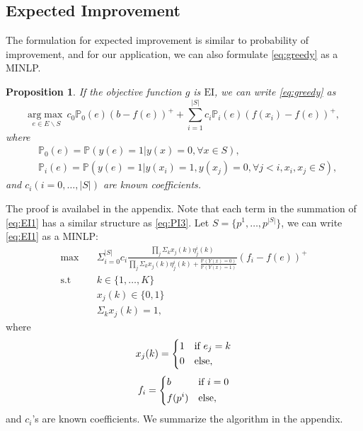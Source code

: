 \documentclass[12pt]{article}
\newcommand{\Prob}{\mathbb{P}}
\newcommand{\EI}{\mathrm{EI}}
\newtheorem{proposition}{Proposition}
\begin{document}
\subsection{Expected Improvement}
The formulation for expected improvement is similar to probability of improvement, and for our application, we can also formulate \eqref{eq:greedy} as a MINLP.
\begin{proposition}
  If the objective function $g$ is $\EI$, we can write \eqref{eq:greedy} as 
  \begin{equation} \label{eq:EI1}
    \underset{e \in E \backslash S}{\mathrm{arg}\max} \, c_0 \mathbb{P}_0(e)(b-f(e))^+ + \sum_{i=1}^{|S|} c_i \mathbb{P}_i(e)(f(x_i)-f(e))^+,
  \end{equation}
  where
  \begin{equation*}
    \begin{split}
      &\mathbb{P}_0(e)=\mathbb{P}(y(e)=1|y(x)=0, \forall x \in S), \\
      &\mathbb{P}_i(e)=\mathbb{P}(y(e)=1|y(x_i)=1, y(x_j)=0, \forall j<i, x_i,x_j \in S),
    \end{split}
  \end{equation*}
  and $c_i (i=0,\ldots,|S|)$ are known coefficients.
\end{proposition}

The proof is availabel in the appendix. Note that each term in the summation of \eqref{eq:EI1} has a similar structure as \eqref{eq:PI3}. Let $S=\{p^1,\ldots,p^{|S|}\}$, we can write \eqref{eq:EI1} as a MINLP:
\begin{equation} \label{eq:EI5}
\begin{split}
\max \quad &\Sigma_{i=0}^{|S|} c_i \frac{\prod_j \Sigma_k x_j(k) \eta_j^i(k)}{\prod_j \Sigma_k x_j(k) \eta_j^i(k) + \frac{\Prob(Y(x)=0)}{\Prob(Y(x)=1)}} (f_i-f(e))^+ \\
\text{s.t} \quad &k \in \{1,\ldots,K\} \\
&x_j(k) \in \{0,1\}\\
&\Sigma_k x_j(k)=1,
\end{split}
\end{equation}
where
\begin{equation*}
x_j(k)=\begin{dcases}
        1 & \text{if $e_j=k$}\\
        0 & \text{else},
\end{dcases}
\end{equation*}
\begin{equation*}
f_i=\begin{dcases}
        b & \text{if $i=0$}\\
        f(p^i)  & \text{else},
\end{dcases}
\end{equation*}
and $c_i$'s are known coefficients. We summarize the algorithm in the appendix.
\end{document}
